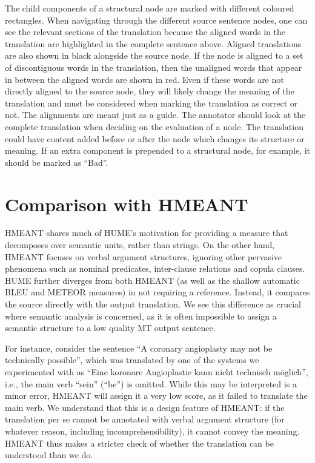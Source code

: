 \documentclass[11pt]{article}
\newcommand{\secref}[1]{Section~\ref{#1}}
\begin{document}
 The child components of a structural node are marked with different coloured rectangles. When navigating through the different source sentence nodes, one can see the relevant sections of the translation because the aligned words in the translation are highlighted in the complete sentence above. Aligned translations are also shown in black alongside the source node. If the node is aligned to a set of discontiguous words in the translation, then the unaligned words that appear in between the aligned words are shown in red. Even if these words are not directly aligned to the source node, they 
will likely change the meaning of the translation and must be considered when marking 
the translation as correct or not. The alignments are meant just as a guide. The annotator should  look at the complete translation when deciding on the evaluation of a node. The translation could have content added before or after the node which changes its
 structure or meaning. If an extra component is prepended to a structural node, for example, it should be marked as ``Bad''.




\section{Comparison with HMEANT}\label{sec:hmeant_comp}

HMEANT shares much of HUME's motivation for providing a
measure that decomposes over semantic units, rather than strings. On the other
hand, HMEANT focuses on verbal
argument structures, ignoring other pervasive phenomena such as nominal predicates, inter-clause
relations and copula clauses.
HUME further diverges from both HMEANT (as well as the shallow automatic BLEU and
METEOR measures) in not requiring a reference.
Instead, it compares the source directly with the output
translation. We see this difference as crucial where semantic analysis is concerned, as it
is often impossible to assign a semantic structure to a low quality MT output sentence.



For instance, consider the sentence ``A coronary angioplasty may not be technically possible'',
which was translated by one of the systems we experimented with as
``Eine koronare Angioplastie kann nicht technisch m{\"o}glich'', i.e., the main verb ``sein'' (``be'') is omitted.
While this may be interpreted is a minor error, HMEANT will assign it a very low score, as it failed to
translate the main verb. We understand that this is a design feature of HMEANT:
if the translation per se cannot be annotated with verbal argument structure
(for whatever reason, including incomprehensibility), it cannot convey the meaning.
HMEANT thus makes a stricter check of whether the translation can be understood
than we do.
\end{document}
